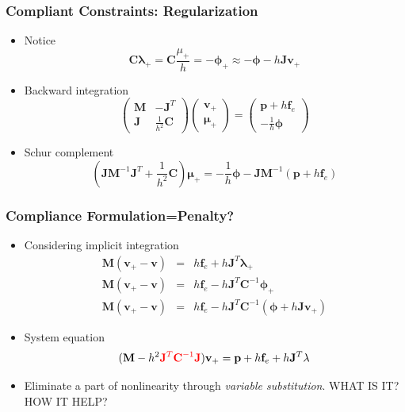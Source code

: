 \documentclass[serif,mathserif]{beamer}
\newcommand{\BOLD}[1]{\mathbf{#1}}
\newcommand{\PDIF}[2]{\frac{\partial #1}{\partial #2}}
\begin{document}
\begin{frame}
 \frametitle{Compliant Constraints: Regularization}
 \begin{itemize}
  \item Notice
  \begin{equation*}
   \BOLD{C\lambda}_+ = \BOLD{C}\frac{\mu_+}{h}=-\BOLD{\BOLD{\phi}}_+\approx-\BOLD{\phi}-h\BOLD{Jv}_+
  \end{equation*}
  \item Backward integration
    \begin{equation*}
     \begin{pmatrix}
      \BOLD{M} & -\BOLD{J}^T \\
      \BOLD{J} & \frac{1}{h^2}\BOLD{C}
     \end{pmatrix}
     \begin{pmatrix}
      \BOLD{v}_+ \\ \BOLD{\mu}_+
     \end{pmatrix}
     =
     \begin{pmatrix}
      \BOLD{p}+h\BOLD{f}_e \\ -\frac{1}{h}\BOLD{\phi}
     \end{pmatrix}
    \end{equation*}
  \item Schur complement
    \begin{equation*}
      (\BOLD{JM}^{-1}\BOLD{J}^T + \frac{1}{h^2}\BOLD{C})\BOLD{\mu}_+ = -\frac{1}{h}\BOLD{\phi}-\BOLD{JM}^{-1}(\BOLD{p}+h\BOLD{f}_e)
    \end{equation*}
 \end{itemize}
\end{frame}

\begin{frame}
 \frametitle{Compliance Formulation=Penalty?}
 \begin{itemize}
  \item Considering implicit integration
    \begin{eqnarray*}
      \BOLD{M}(\BOLD{v}_+-\BOLD{v}) &=& h\BOLD{f}_{e}+h\BOLD{J}^T\BOLD{\lambda}_+ \\
      \BOLD{M}(\BOLD{v}_+-\BOLD{v}) &=& h\BOLD{f}_{e}-h\BOLD{J}^T\BOLD{C}^{-1}\BOLD{\phi}_+ \\
      \BOLD{M}(\BOLD{v}_+-\BOLD{v}) &=& h\BOLD{f}_{e}-h\BOLD{J}^T\BOLD{C}^{-1}(\BOLD{\phi}+h\BOLD{Jv}_+)
    \end{eqnarray*}
  \item System equation 
    \begin{equation*}
      (\BOLD{M}-h^2{\color{red}\BOLD{J}^T\BOLD{C}^{-1}\BOLD{J}})\BOLD{v}_+ = \BOLD{p}+h\BOLD{f}_{e}+h\BOLD{J}^T\BOLD{\lambda}
    \end{equation*}
  \pause
  \TikzDraw {
    \node at (-0.4, -0.4) {\huge \color{red} $\neq \PDIF{\BOLD{f}_c}{\BOLD{x}}$};
  }
  \item Eliminate a part of nonlinearity through \textit{\color{yellow}variable substitution}. WHAT IS IT? HOW IT HELP?
 \end{itemize}
\end{frame}
\end{document}
